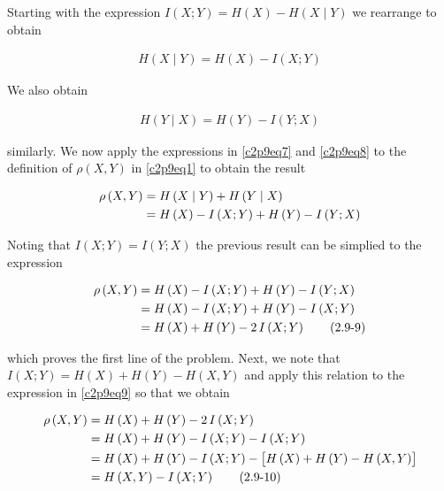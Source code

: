 \documentclass[ClusteringConnectionsMAIN.tex]{subfiles}
\begin{document}
	
	
  Starting with the expression $I \left( X; Y \right) = H \left( X \right) - H \left( X \mid Y \right)$ we rearrange to obtain

\begin{align} \label{c2p9eq7}
H \left( X \mid Y \right) = H \left( X \right) - I \left( X; Y \right) \tag{2.9-7}
\end{align}

We also obtain

\begin{align} \label{c2p9eq8}
H \left( Y \mid X \right) = H \left( Y \right) - I \left( Y; X \right) \tag{2.9-8}
\end{align}

similarly.  We now apply the expressions in \ref{c2p9eq7} and \ref{c2p9eq8} to the definition of $\rho \left( X, Y \right)$ in \ref{c2p9eq1} to obtain the result

\begin{align}
\rho \left( X, Y \right) &= H \left( X \mid Y \right)+ H \left( Y \mid X \right) \notag \\
&= H \left( X \right) - I \left( X; Y \right) + H \left( Y \right) - I \left( Y; X \right) \notag
\end{align}

Noting that $I \left( X; Y \right) = I \left( Y; X \right)$ the previous result can be simplied to the expression

\begin{align} \label{c2p9eq9}
\rho \left( X, Y \right) &= H \left( X \right) - I \left( X; Y \right) + H \left( Y \right) - I \left( Y; X \right) \notag \\
&= H \left( X \right) - I \left( X; Y \right) + H \left( Y \right) - I \left( X; Y \right) \notag \\
&= H \left( X \right) + H \left( Y \right) - 2 \, I \left( X; Y \right) \tag{2.9-9}
\end{align}

which proves the first line of the problem.  Next, we note that $I \left( X; Y \right) = H \left( X \right) + H \left( Y \right) - H \left( X, Y \right)$ and apply this relation to the expression in \ref{c2p9eq9} so that we obtain

\begin{align} \label{c2p9eq10}
\rho \left( X, Y \right) &= H \left( X \right) + H \left( Y \right) - 2 \, I \left( X; Y \right) \notag \\
&= H \left( X \right) + H \left( Y \right) - I \left( X; Y \right) - I \left( X; Y \right) \notag \\
&= H \left( X \right) + H \left( Y \right) - I \left( X; Y \right) - \bigl[ H \left( X \right) + H \left( Y \right) - H \left( X, Y \right) \bigr] \notag \\
&= H \left( X, Y \right) - I \left( X; Y \right)   \tag{2.9-10}
\end{align}
\end{document}
